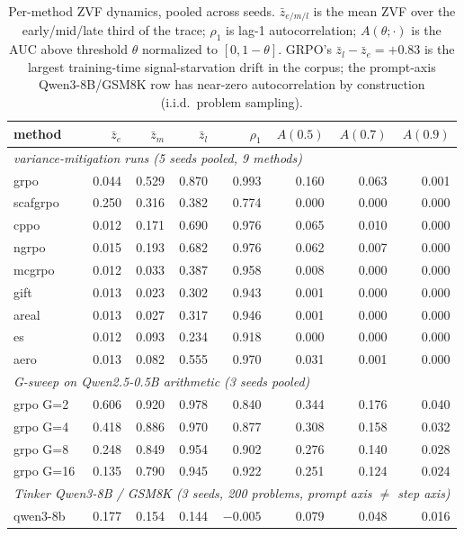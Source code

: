 \begin{table}[htbp]
\centering
\small
\begin{tabular}{lrrrrrrr}
\toprule
method & $\bar z_e$ & $\bar z_m$ & $\bar z_l$ & $\rho_1$ & $A(0.5)$ & $A(0.7)$ & $A(0.9)$ \\
\midrule
\multicolumn{8}{l}{\emph{variance-mitigation runs (5 seeds pooled, 9 methods)}}\\
grpo      & 0.044 & 0.529 & 0.870 & 0.993 & 0.160 & 0.063 & 0.001 \\
scafgrpo  & 0.250 & 0.316 & 0.382 & 0.774 & 0.000 & 0.000 & 0.000 \\
cppo      & 0.012 & 0.171 & 0.690 & 0.976 & 0.065 & 0.010 & 0.000 \\
ngrpo     & 0.015 & 0.193 & 0.682 & 0.976 & 0.062 & 0.007 & 0.000 \\
mcgrpo    & 0.012 & 0.033 & 0.387 & 0.958 & 0.008 & 0.000 & 0.000 \\
gift      & 0.013 & 0.023 & 0.302 & 0.943 & 0.001 & 0.000 & 0.000 \\
areal     & 0.013 & 0.027 & 0.317 & 0.946 & 0.001 & 0.000 & 0.000 \\
es        & 0.012 & 0.093 & 0.234 & 0.918 & 0.000 & 0.000 & 0.000 \\
aero      & 0.013 & 0.082 & 0.555 & 0.970 & 0.031 & 0.001 & 0.000 \\
\midrule
\multicolumn{8}{l}{\emph{G-sweep on Qwen2.5-0.5B arithmetic (3 seeds pooled)}}\\
grpo G=2  & 0.606 & 0.920 & 0.978 & 0.840 & 0.344 & 0.176 & 0.040 \\
grpo G=4  & 0.418 & 0.886 & 0.970 & 0.877 & 0.308 & 0.158 & 0.032 \\
grpo G=8  & 0.248 & 0.849 & 0.954 & 0.902 & 0.276 & 0.140 & 0.028 \\
grpo G=16 & 0.135 & 0.790 & 0.945 & 0.922 & 0.251 & 0.124 & 0.024 \\
\midrule
\multicolumn{8}{l}{\emph{Tinker Qwen3-8B / GSM8K (3 seeds, 200 problems, prompt axis $\neq$ step axis)}}\\
qwen3-8b  & 0.177 & 0.154 & 0.144 & $-0.005$ & 0.079 & 0.048 & 0.016 \\
\bottomrule
\end{tabular}
\caption{Per-method ZVF dynamics, pooled across seeds. $\bar z_{e/m/l}$ is
the mean ZVF over the early/mid/late third of the trace; $\rho_1$ is lag-1
autocorrelation; $A(\theta;\cdot)$ is the AUC above threshold $\theta$
normalized to $[0,1-\theta]$. GRPO's $\bar z_l - \bar z_e = +0.83$ is the
largest training-time signal-starvation drift in the corpus; the
prompt-axis Qwen3-8B/GSM8K row has near-zero autocorrelation by
construction (i.i.d.\ problem sampling).}
\label{tab:zvf-dynamics-pool}
\end{table}


